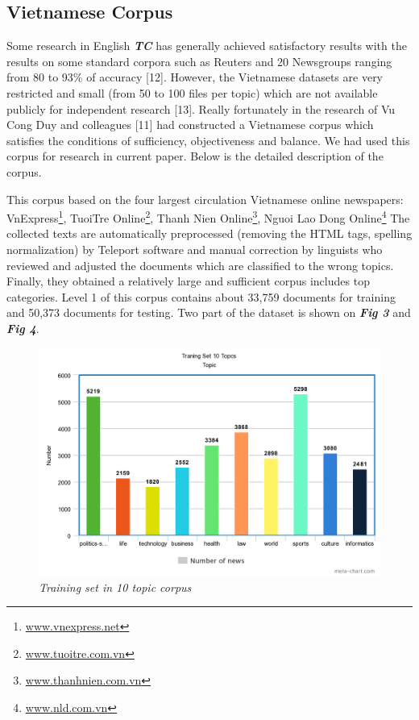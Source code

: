 \documentclass[conference]{IEEEtran}
\begin{document}
\subsection{Vietnamese Corpus}
Some research in English \textbf{\textit{TC}} has generally achieved satisfactory results with the
results on some standard corpora such as Reuters and 20 Newsgroups ranging from 80 to 93\% of accuracy [12]. However, the Vietnamese datasets are very restricted and small (from 50 to 100 files per topic) which are not available publicly for independent research [13]. Really fortunately in the research of Vu Cong Duy and colleagues [11] had constructed a Vietnamese corpus which satisfies the conditions of sufficiency, objectiveness and balance. We had used this corpus for research in current paper. Below is the detailed description of the corpus.

This corpus based on the four largest circulation Vietnamese online newspapers: VnExpress\footnote{\url{www.vnexpress.net}}, TuoiTre Online\footnote{\url{www.tuoitre.com.vn}}, Thanh Nien Online\footnote{\url{www.thanhnien.com.vn}}, Nguoi Lao Dong Online\footnote{\url{www.nld.com.vn}}
The collected texts are automatically preprocessed
(removing the HTML tags, spelling normalization) by Teleport
software and manual correction by linguists who reviewed and adjusted the documents which are
classified to the wrong topics. Finally, they obtained a relatively large and sufficient corpus includes top categories. Level 1 of this corpus contains about 33,759 documents for training and 50,373 documents for testing. Two part of the dataset is shown on \textit{\textbf{Fig 3}} and \textit{\textbf{Fig 4}}.

\begin{figure}[h]
\includegraphics[scale=0.2]{training_10.png}
\centering
\caption{\textit{Training set in 10 topic corpus}}
\end{figure}
\end{document}
